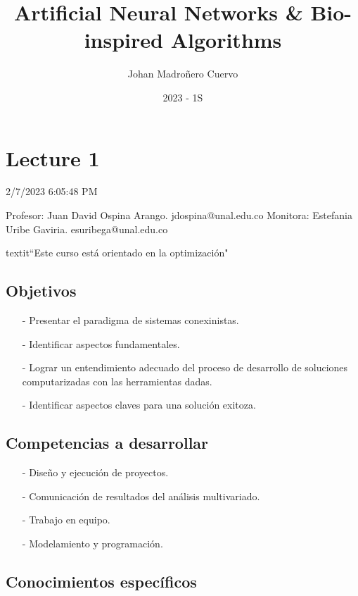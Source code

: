 \documentclass{article}
\author{Johan Madroñero Cuervo}
\title{Artificial Neural Networks \& Bio-inspired Algorithms}
\date{2023 - 1S}
\theoremstyle{definition}
\begin{document}
\maketitle
\thispagestyle{empty}
\newpage
\tableofcontents
\thispagestyle{empty}
\newpage

\section{Lecture 1}
2/7/2023 6:05:48 PM

Profesor: Juan David Ospina Arango. jdospina@unal.edu.co
Monitora: Estefania Uribe Gaviria. esuribega@unal.edu.co

textit{``Este curso está orientado en la optimización"}

\subsection{Objetivos}

\begin{itemize}

  \item[-] Presentar el paradigma de sistemas conexinistas.
  \item[-] Identificar aspectos fundamentales.
  \item[-] Lograr un entendimiento adecuado del proceso de desarrollo 
    de soluciones computarizadas con las herramientas dadas.
  \item[-] Identificar aspectos claves para una solución exitoza.

\end{itemize}

\subsection{Competencias a desarrollar}

\begin{itemize}

  \item[-] Diseño y ejecución de proyectos.
  \item[-] Comunicación de resultados del análisis multivariado.
  \item[-] Trabajo en equipo.
  \item[-] Modelamiento y programación.

\end{itemize}

\subsection{Conocimientos específicos}
\end{document}
